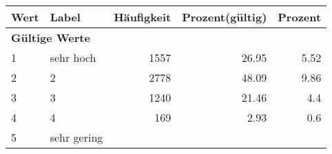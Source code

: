      \begin{longtable}{lXrrr}
     \toprule
     \textbf{Wert} & \textbf{Label} & \textbf{Häufigkeit} & \textbf{Prozent(gültig)} & \textbf{Prozent} \\
     \endhead
     \midrule
     \multicolumn{5}{l}{\textbf{Gültige Werte}}\\

     1 &
     \multicolumn{1}{X}{ sehr hoch   } &


       \num{1557} &
       \num[round-mode=places,round-precision=2]{26,95} &
         \num[round-mode=places,round-precision=2]{5,52} \\

     2 &
     \multicolumn{1}{X}{ 2   } &


       \num{2778} &
       \num[round-mode=places,round-precision=2]{48,09} &
         \num[round-mode=places,round-precision=2]{9,86} \\

     3 &
     \multicolumn{1}{X}{ 3   } &


       \num{1240} &
       \num[round-mode=places,round-precision=2]{21,46} &
         \num[round-mode=places,round-precision=2]{4,4} \\

     4 &
     \multicolumn{1}{X}{ 4   } &


       \num{169} &
       \num[round-mode=places,round-precision=2]{2,93} &
         \num[round-mode=places,round-precision=2]{0,6} \\

     5 &
     \multicolumn{1}{X}{ sehr gering   } &



\end{longtable}
